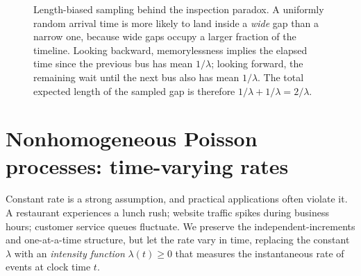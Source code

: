 \begin{figure}[H]
\centering
{}
\caption{Length-biased sampling behind the inspection paradox. A uniformly
random arrival time is more likely to land inside a \emph{wide} gap than a narrow
one, because wide gaps occupy a larger fraction of the timeline. Looking backward,
memorylessness implies the elapsed time since the previous bus has mean $1/\lambda$;
looking forward, the remaining wait until the next bus also has mean $1/\lambda$.
The total expected length of the sampled gap is therefore $1/\lambda + 1/\lambda = 2/\lambda$.}
\label{ch25:fig-inspection}
\end{figure}

\section{Nonhomogeneous Poisson processes: time-varying rates}
\label{ch25:nonhomogeneous}

Constant rate is a strong assumption, and practical applications often violate it. A restaurant
experiences a lunch rush; website traffic spikes during business hours; customer service queues fluctuate.
We preserve the independent-increments and one-at-a-time structure, but let the rate vary
in time, replacing the constant $\lambda$ with an \emph{intensity function}
$\lambda(t) \ge 0$ that measures the instantaneous rate of events at clock time $t$.


